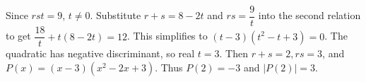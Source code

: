 Since $rst=9$, $t\ne0$. Substitute $r+s=8-2t$ and $rs=\dfrac{9}{t}$ into the second relation to get $\dfrac{18}{t}+t(8-2t)=12$. This simplifies to $(t-3)(t^2-t+3)=0$. The quadratic has negative discriminant, so real $t=3$. Then $r+s=2,rs=3$, and $P(x)=(x-3)(x^2-2x+3)$. Thus $P(2)=-3$ and $\boxed{|P(2)|=3}$.
